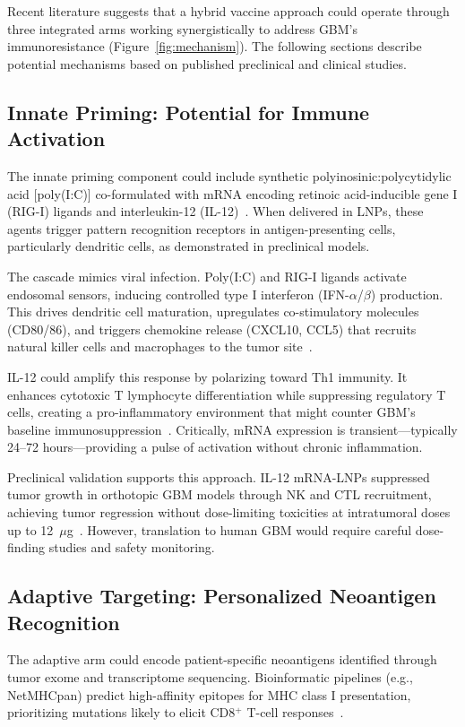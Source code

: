 \documentclass[12pt]{article}
\begin{document}
Recent literature suggests that a hybrid vaccine approach could operate through three integrated arms working synergistically to address GBM's immunoresistance (Figure~\ref{fig:mechanism}). The following sections describe potential mechanisms based on published preclinical and clinical studies.

\subsection{Innate Priming: Potential for Immune Activation}
The innate priming component could include synthetic polyinosinic:polycytidylic acid [poly(I:C)] co-formulated with mRNA encoding retinoic acid-inducible gene I (RIG-I) ligands and interleukin-12 (IL-12)~\citep{ammi2015,jiang2023,aunins2025}. When delivered in LNPs, these agents trigger pattern recognition receptors in antigen-presenting cells, particularly dendritic cells, as demonstrated in preclinical models.

The cascade mimics viral infection. Poly(I:C) and RIG-I ligands activate endosomal sensors, inducing controlled type I interferon (IFN-$\alpha$/$\beta$) production. This drives dendritic cell maturation, upregulates co-stimulatory molecules (CD80/86), and triggers chemokine release (CXCL10, CCL5) that recruits natural killer cells and macrophages to the tumor site~\citep{jiang2023}.

IL-12 could amplify this response by polarizing toward Th1 immunity. It enhances cytotoxic T lymphocyte differentiation while suppressing regulatory T cells, creating a pro-inflammatory environment that might counter GBM's baseline immunosuppression~\citep{aunins2025,tapescu2024}. Critically, mRNA expression is transient—typically 24--72 hours—providing a pulse of activation without chronic inflammation.

Preclinical validation supports this approach. IL-12 mRNA-LNPs suppressed tumor growth in orthotopic GBM models through NK and CTL recruitment, achieving tumor regression without dose-limiting toxicities at intratumoral doses up to 12~$\mu$g~\citep{aunins2025,lai2018}. However, translation to human GBM would require careful dose-finding studies and safety monitoring.

\subsection{Adaptive Targeting: Personalized Neoantigen Recognition}
The adaptive arm could encode patient-specific neoantigens identified through tumor exome and transcriptome sequencing. Bioinformatic pipelines (e.g., NetMHCpan) predict high-affinity epitopes for MHC class I presentation, prioritizing mutations likely to elicit CD8$^+$ T-cell responses~\citep{hilf2024}.
\end{document}
